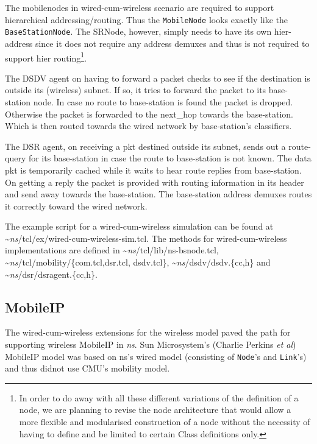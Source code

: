 The mobilenodes in wired-cum-wireless scenario are required to support
hierarchical addressing/routing. Thus the {\tt MobileNode} looks
exactly like the {\tt BaseStationNode}. The SRNode, however, simply
needs to have its own hier-address since it does not require any
address demuxes and thus is not required to support hier
routing\footnote{In order to do away with all these different
  variations of the definition of a node, we are planning to revise
  the node architecture that would allow a more flexible
  and modularised construction of a node without the necessity of having
  to define and be limited to certain Class definitions only.}.

The DSDV agent on having to forward a packet checks to see if the
destination is outside its (wireless) subnet. If so, it tries to
forward the packet to its base-station node. In case no route to
base-station is found the packet is dropped. Otherwise the
packet is forwarded to the next\_hop towards the base-station. Which
is then routed towards the wired network by base-station's
classifiers.

The DSR agent, on receiving a pkt destined outside its subnet, sends
out a route-query for its base-station in case the route to
base-station is not known. The data pkt is temporarily cached while it
waits to hear route replies from base-station. On getting a reply the
packet is provided with routing information in its header and send
away towards the base-station. The base-station address demuxes routes
it correctly toward the wired network.

The example script for a wired-cum-wireless simulation can be found at
\textasciitilde\emph{ns}/{tcl/ex/wired-cum-wireless-sim.tcl}. The methods for
wired-cum-wireless implementations are defined in
\textasciitilde\emph{ns}/{tcl/lib/ns-bsnode.tcl}, \textasciitilde\emph{ns}/{tcl/mobility/\{com.tcl,dsr.tcl,
  dsdv.tcl\}}, \textasciitilde\emph{ns}/{dsdv/dsdv.\{cc,h\}} and
\textasciitilde\emph{ns}/{dsr/dsragent.\{cc,h\}}.


\subsection{MobileIP}
\label{sec:mobileip}

The wired-cum-wireless extensions for the wireless model paved the
path for supporting wireless MobileIP in \emph{ns}. Sun Microsystem's
(Charlie Perkins {\em et al}) MobileIP model was based on ns's wired model
(consisting of {\tt Node}'s and {\tt Link}'s) and thus didnot use
CMU's mobility model.

